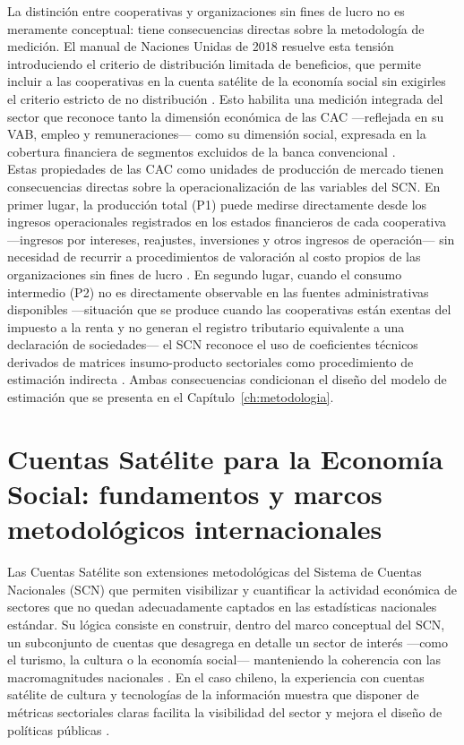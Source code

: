 La distinción entre cooperativas y organizaciones sin fines de lucro no es 
meramente conceptual: tiene consecuencias directas sobre la metodología de 
medición. El manual de Naciones Unidas de 2018 resuelve esta tensión 
introduciendo el criterio de distribución limitada de beneficios, que permite 
incluir a las cooperativas en la cuenta satélite de la economía social sin 
exigirles el criterio estricto de no distribución \cite{vereinte_nationen_satellite_2018}. 
Esto habilita una medición integrada del sector que reconoce tanto la 
dimensión económica de las CAC ---reflejada en su VAB, empleo y 
remuneraciones--- como su dimensión social, expresada en la cobertura 
financiera de segmentos excluidos de la banca convencional 
.\\

Estas propiedades de las CAC como unidades de producción de mercado tienen 
consecuencias directas sobre la operacionalización de las variables del SCN. 
En primer lugar, la producción total (P1) puede medirse directamente desde 
los ingresos operacionales registrados en los estados financieros de cada 
cooperativa ---ingresos por intereses, reajustes, inversiones y otros ingresos 
de operación--- sin necesidad de recurrir a procedimientos de valoración al 
costo propios de las organizaciones sin fines de lucro 
\cite{vereinte_nationen_satellite_2018}. En segundo lugar, cuando el consumo 
intermedio (P2) no es directamente observable en las fuentes administrativas 
disponibles ---situación que se produce cuando las cooperativas están exentas 
del impuesto a la renta y no generan el registro tributario equivalente a una 
declaración de sociedades--- el SCN reconoce el uso de coeficientes técnicos 
derivados de matrices insumo-producto sectoriales como procedimiento de 
estimación indirecta . Ambas consecuencias 
condicionan el diseño del modelo de estimación que se presenta en el 
Capítulo~\ref{ch:metodologia}.


\section{Cuentas Satélite para la Economía Social: fundamentos y marcos 
metodológicos internacionales}
\label{sec:cuentas-satelite}
Las Cuentas Satélite son extensiones metodológicas del Sistema de Cuentas 
Nacionales (SCN) que permiten visibilizar y cuantificar la actividad económica 
de sectores que no quedan adecuadamente captados en las estadísticas nacionales 
estándar. Su lógica consiste en construir, dentro del marco conceptual del SCN, 
un subconjunto de cuentas que desagrega en detalle un sector de interés ---como 
el turismo, la cultura o la economía social--- manteniendo la coherencia con las 
macromagnitudes nacionales \cite{barea_tejeiro_manual_2007}. En el caso chileno, 
la experiencia con cuentas satélite de cultura y tecnologías de la información 
muestra que disponer de métricas sectoriales claras facilita la visibilidad del 
sector y mejora el diseño de políticas públicas \cite{noauthor_cuenta_2006}.\\

